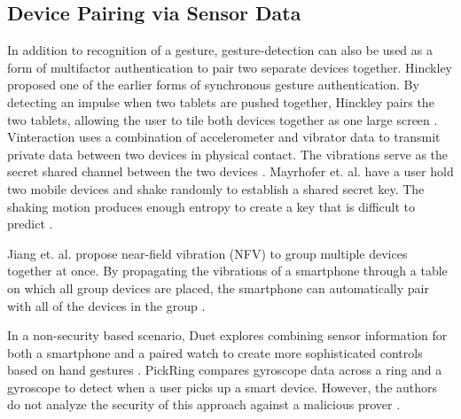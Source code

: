 
\subsection{Device Pairing via Sensor Data}

In addition to recognition of a gesture, gesture-detection can also be used as a form of multifactor authentication to pair two separate devices together. Hinckley proposed one of the earlier forms of synchronous gesture authentication. By detecting an impulse when two tablets are pushed together, Hinckley pairs the two tablets, allowing the user to tile both devices together as one large screen \cite{SyncGes}. Vinteraction uses a combination of accelerometer and vibrator data to transmit private data between two devices in physical contact. The vibrations serve as the secret shared channel between the two devices \cite{vinteraction}. Mayrhofer et. al. have a user hold two mobile devices and shake randomly to establish a shared secret key. The shaking motion produces enough entropy to create a key that is difficult to predict \cite{ShakeWell}.

Jiang et. al. propose near-field vibration (NFV) to group multiple devices together at once. By propagating the vibrations of a smartphone through a table on which all group devices are placed, the smartphone can automatically pair with all of the devices in the group \cite{Jiang2016}. 

In a non-security based scenario, Duet explores combining sensor information for both a smartphone and a paired watch to create more sophisticated controls based on hand gestures \cite{Duet}. PickRing compares gyroscope data across a ring and a gyroscope to detect when a user picks up a smart device. However, the authors do not analyze the security of this approach against a malicious prover \cite{Wolf:2015}.